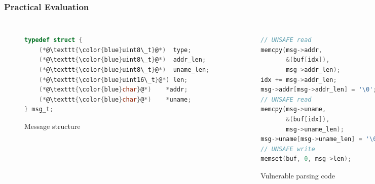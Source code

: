 \begin{frame}[fragile]
\frametitle{Practical Evaluation}

\begin{columns}[c]


\begin{figure}
\vspace*{-0.5cm}
\caption{Message structure}
\vspace*{-0.85cm}
\begin{lstlisting}[language=C,frame=single]
typedef struct {
    (*@\texttt{\color{blue}uint8\_t}@*)  type;
    (*@\texttt{\color{blue}uint8\_t}@*)  addr_len;
    (*@\texttt{\color{blue}uint8\_t}@*)  uname_len;
    (*@\texttt{\color{blue}uint16\_t}@*) len;
    (*@\texttt{\color{blue}char}@*)    *addr;
    (*@\texttt{\color{blue}char}@*)    *uname;
} msg_t;
\end{lstlisting}
\end{figure}

\begin{figure}
\vspace*{-1cm}
\caption{Vulnerable parsing code}
\vspace*{-1cm}
\begin{lstlisting}[language=C,frame=single]
// UNSAFE read
memcpy(msg->addr,
       &(buf[idx]),
       msg->addr_len);
idx += msg->addr_len;
msg->addr[msg->addr_len] = '\0';
// UNSAFE read
memcpy(msg->uname,
       &(buf[idx]),
       msg->uname_len);
msg->uname[msg->uname_len] = '\0';
// UNSAFE write
memset(buf, 0, msg->len);
\end{lstlisting}
\end{figure}



\begin{center}
\begin{figure}
\vspace*{-0.6cm}
\caption{\texttt{afl} run}
\vspace*{-0.5cm}
\includegraphics[scale=0.32]{../figures/afl-run}
\end{figure}
\end{center}


\end{columns}
\end{frame}
